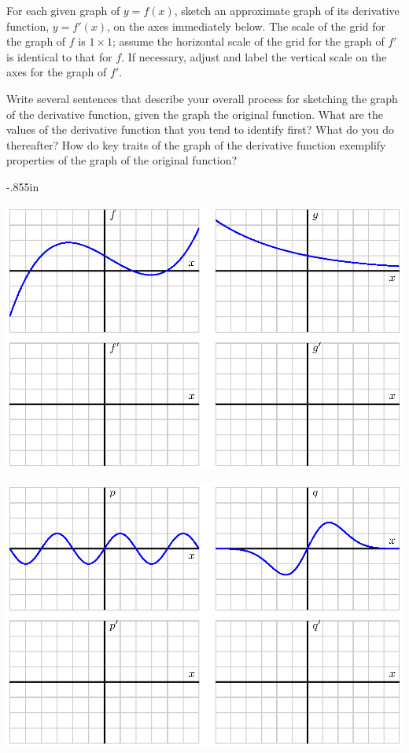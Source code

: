 \begin{activity} \label{A:2.2.1}
For each given graph of $y = f(x)$, sketch an approximate graph of its derivative function, $y = f'(x)$, on the axes immediately below.  The scale of the grid for the graph of $f$ is $1 \times 1$; assume the horizontal scale of the grid for the graph of $f'$ is identical to that for $f$.  If necessary, adjust and label the vertical scale on the axes for the graph of $f'$.

Write several sentences that describe your overall process for sketching the graph of the derivative function, given the graph the original function.  What are the values of the derivative function that you tend to identify first?  What do you do thereafter?  How do key traits of the graph of the derivative function exemplify properties of the graph of the original function?
\end{activity}

\begin{adjustwidth*}{}{-.855in}
\begin{center}
\includegraphics{figures/1_4_Act1a.eps} 
\centerline{\hspace{4in}}
\includegraphics{figures/1_4_Act1b.eps}
\end{center}
\end{adjustwidth*}

